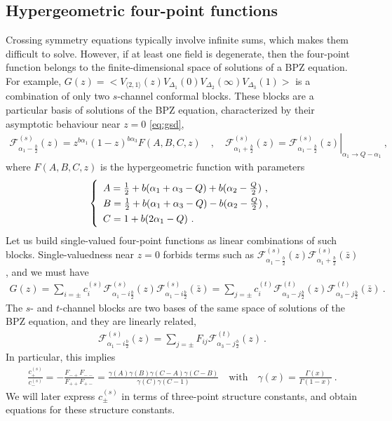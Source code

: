 \documentclass[12pt, a4paper]{article}
\theoremstyle{break}
\begin{document}
\subsection{Hypergeometric four-point functions}

Crossing symmetry equations typically involve infinite sums, which makes them difficult to solve.
However, if at least one field is degenerate, then the four-point function belongs to the finite-dimensional space of solutions of a BPZ equation. 
For example,
$G(z)= \Big< V_{\langle 2, 1 \rangle}(z) V_{\Delta_1}(0)V_{\Delta_2}(\infty)V_{\Delta_3}(1) \Big>$ is a combination of only two $s$-channel conformal blocks.
These blocks are a particular basis of solutions of the BPZ equation, characterized by their asymptotic behaviour near $z=0$ \eqref{eq:gsd}, 
\begin{align}
\mathcal{F}^{(s)}_{\alpha_1-\frac{b}{2}}(z) = z^{b\alpha_1} (1-z)^{b\alpha_3} F(A,B,C,z)\quad , \quad 
 \mathcal{F}^{(s)}_{\alpha_1+\frac{b}{2}}(z) = \left. \mathcal{F}^{(s)}_{\alpha_1-\frac{b}{2}}(z) \right|_{\alpha_1\to Q-\alpha_1} \ ,
\label{gpm}
\end{align}
where $F(A,B,C,z)$ is the hypergeometric function with parameters
\begin{align}
\renewcommand{\arraystretch}{1.3}
\left\{\begin{array}{l}   A = \frac12 + b(\alpha_1+\alpha_3-Q) + b(\alpha_2-\tfrac{Q}{2}) \ , \\
      B = \frac12 + b(\alpha_1+\alpha_3-Q) - b(\alpha_2-\tfrac{Q}{2}) \ , \\
      C = 1 + b(2\alpha_1-Q) \ .
\end{array}\right. 
\label{abc}
\end{align}
Let us build single-valued four-point functions as linear combinations of such blocks. Single-valuedness near $z=0$ forbids terms such as $\mathcal{F}^{(s)}_{\alpha_1-\frac{b}{2}}(z) \mathcal{F}^{(s)}_{\alpha_1+\frac{b}{2}}(\bar z)$, and we must have 
\begin{align}
 G(z) = \sum_{i=\pm} c^{(s)}_{i} \mathcal{F}^{(s)}_{\alpha_1-i\frac{b}{2}}(z) \mathcal{F}^{(s)}_{\alpha_1-i\frac{b}{2}}(\bar z) = \sum_{j=\pm} c^{(t)}_{i} \mathcal{F}^{(t)}_{\alpha_3-j\frac{b}{2}}(z) \mathcal{F}^{(t)}_{\alpha_3-j\frac{b}{2}}(\bar z)\ .
\end{align}
The $s$- and $t$-channel blocks are two bases of the same space of solutions of the BPZ equation, and they are linearly related,
\begin{align}
 \mathcal{F}^{(s)}_{\alpha_1-i\frac{b}{2}}(z) = \sum_{j=\pm} F_{ij} \mathcal{F}^{(t)}_{\alpha_3-j\frac{b}{2}}(z)\ .
\end{align}
In particular, this implies 
\begin{align}
 \frac{c_{+}^{(s)}}{c_{-}^{(s)}} = -\frac{F_{-+}F_{--}}{F_{++}F_{+-}} 
 = \frac{\gamma(A)\gamma(B)\gamma(C-A)\gamma(C-B)}{\gamma(C)\gamma(C-1)}\quad \text{with} \quad \gamma(x) =\frac{\Gamma(x)}{\Gamma(1-x)}\ .
 \label{eq:coc}
\end{align}
We will later express $c_\pm^{(s)}$ in terms of three-point structure constants, and obtain equations for these structure constants.
\end{document}
